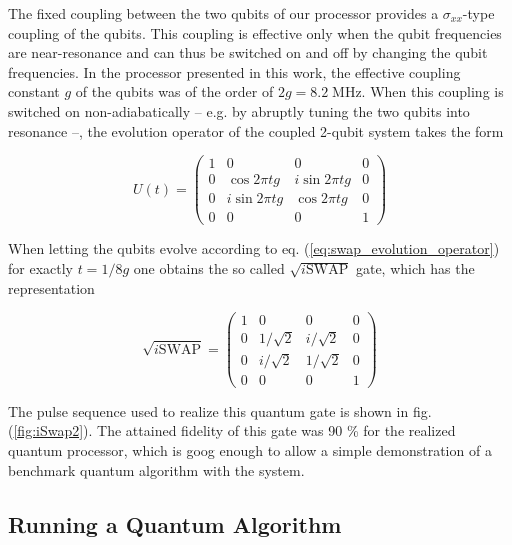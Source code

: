 The fixed coupling between the two qubits of our processor provides a $\sigma_{xx}$-type coupling of the qubits. This coupling is effective only when the qubit frequencies are near-resonance and can thus be switched on and off by changing the qubit frequencies. In the processor presented in this work, the effective coupling constant $g$ of the qubits was of the order of $2g = 8.2 \; \mathrm{MHz}$. When this coupling is switched on non-adiabatically -- e.g. by abruptly tuning the two qubits into resonance --, the evolution operator of the coupled 2-qubit system takes the form

\begin{equation}
	U(t)  =  \left( \begin{array}{cccc} 1 & 0 & 0 & 0 \\ 0 & \cos{2 \pi t g} & i\sin{2 \pi t g} & 0 \\ 0 & i\sin{2 \pi t g} & \cos{2 \pi t g} & 0 \\ 0 & 0 & 0 & 1 \end{array} \right) \label{eq:swap_evolution_operator}
\end{equation}

When letting the qubits evolve according to eq. (\ref{eq:swap_evolution_operator}) for exactly $t = 1/8g$ one obtains the so called $\sqrt{i\mathrm{SWAP}}$ gate, which has the representation

\begin{equation}
	\sqrt{i\mathrm{SWAP}}  =  \left( \begin{array}{cccc} 1 & 0 & 0 & 0 \\ 0 & 1/\sqrt{2} & i/\sqrt{2} & 0 \\ 0 & i/\sqrt{2} & 1/\sqrt{2} & 0 \\ 0 & 0 & 0 & 1 \end{array} \right) \label{eq:sqrt_iswap_gate}
\end{equation}

The pulse sequence used to realize this quantum gate is shown in fig. (\ref{fig:iSwap2}).  The attained fidelity of this gate was 90 \% for the realized quantum processor, which is goog enough to allow a simple demonstration of a benchmark quantum algorithm with the system.

\subsection{Running a Quantum Algorithm}

